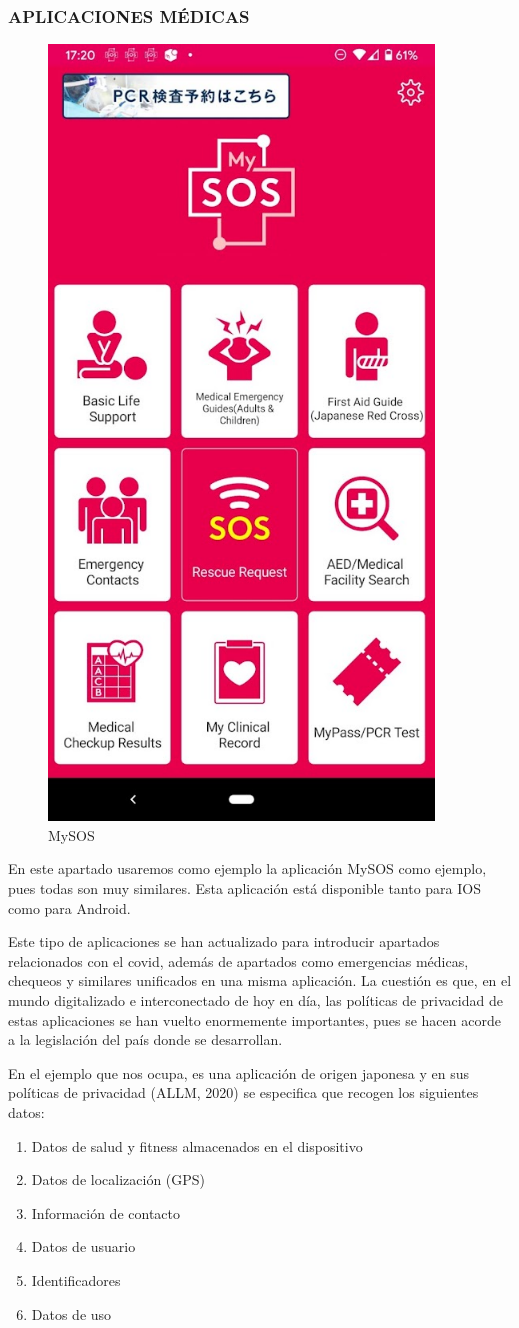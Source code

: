 \documentclass[11pt,a4paper,spanish]{article}
\begin{document}
\newpage
\subsubsection{APLICACIONES MÉDICAS}
\begin{figure}[h!]
  \centering
  \includegraphics[width=0.35\linewidth]{9.png} 
  \caption{MySOS}
\end{figure}

En este apartado usaremos como ejemplo la aplicación MySOS como ejemplo, pues todas son muy similares. Esta aplicación está disponible tanto para IOS como para Android.


Este tipo de aplicaciones se han actualizado para introducir apartados relacionados con el covid, además de apartados como emergencias médicas, chequeos y similares unificados en una misma aplicación. 
La cuestión es que, en el mundo digitalizado e interconectado de hoy en día, las políticas de privacidad de estas aplicaciones se han vuelto enormemente importantes, pues se hacen acorde a la legislación del país donde se desarrollan. 

En el ejemplo que nos ocupa, es una aplicación de origen japonesa y en sus políticas de privacidad (ALLM, 2020) se especifica que recogen los siguientes datos:

\begin{enumerate}
\item Datos de salud y fitness almacenados en el dispositivo
\item Datos de localización (GPS)
\item Información de contacto
\item Datos de usuario
\item Identificadores
\item Datos de uso
\end{enumerate} 
\end{document}
